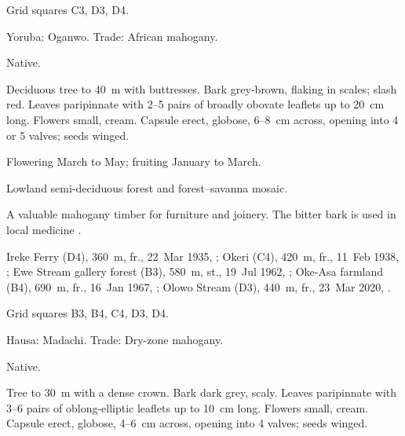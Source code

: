 \begin{florakey}
 Grid squares C3, D3, D4.

\begin{center}
\end{center}

\label{sp:MEL02}

 Yoruba: Oganwo. Trade: African
mahogany.

 Native.

 Deciduous tree to 40~m with buttresses. Bark
grey-brown, flaking in scales; slash red. Leaves paripinnate with
2--5 pairs of broadly obovate leaflets up to 20~cm long. Flowers
small, cream. Capsule erect, globose, 6--8~cm across, opening into 4
or 5 valves; seeds winged.

 Flowering March to May; fruiting January to March.

 Lowland semi-deciduous forest and forest--savanna
mosaic.

 A valuable mahogany timber for furniture and joinery. The
bitter bark is used in local medicine \citep{keay1989,louppe2008}.

 Ireke Ferry (D4), 360~m, fr., 22~Mar 1935, ;
Okeri (C4), 420~m, fr., 11~Feb 1938, ;
Ewe Stream gallery forest (B3), 580~m, st., 19~Jul 1962, ;
Oke-Asa farmland (B4), 690~m, fr., 16~Jan 1967, ;
Olowo Stream (D3), 440~m, fr., 23~Mar 2020, .

 Grid squares B3, B4, C4, D3, D4.

\begin{center}
\end{center}

\label{sp:MEL03}

 

 Hausa: Madachi. Trade: Dry-zone
mahogany.

 Native.

 Tree to 30~m with a dense crown. Bark dark grey,
scaly. Leaves paripinnate with 3--6 pairs of oblong-elliptic leaflets
up to 10~cm long. Flowers small, cream. Capsule erect, globose,
4--6~cm across, opening into 4 valves; seeds winged.


\end{florakey}
